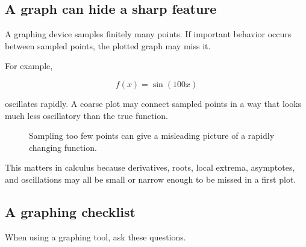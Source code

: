 \subsection{A graph can hide a sharp feature}
\label{appsubsec:graph-can-hide-sharp-feature}

A graphing device samples finitely many points.  If important behavior occurs between
sampled points, the plotted graph may miss it.

For example,

\[
f(x)=\sin(100x)
\]

oscillates rapidly.  A coarse plot may connect sampled points in a way that looks much
less oscillatory than the true function.

\begin{figure}[h]
\centering
{}
\caption{Sampling too few points can give a misleading picture of a rapidly changing function.}
\label{fig:technology-sampling-oscillation}
\end{figure}

This matters in calculus because derivatives, roots, local extrema, asymptotes, and
oscillations may all be small or narrow enough to be missed in a first plot.

\subsection{A graphing checklist}
\label{appsubsec:graphing-checklist}

When using a graphing tool, ask these questions.

